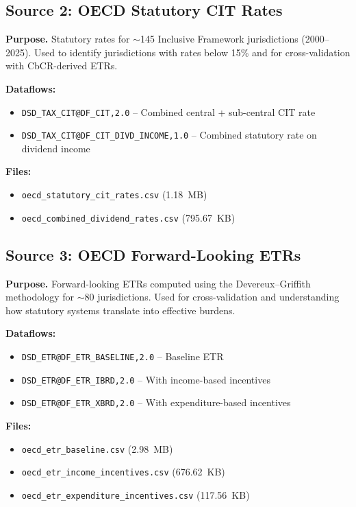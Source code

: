 \documentclass[12pt,a4paper]{article}
\begin{document}
\subsection{Source 2: OECD Statutory CIT Rates}\label{sec:src_citrates}

\textbf{Purpose.}
Statutory rates for $\sim$145 Inclusive Framework jurisdictions (2000--2025).
Used to identify jurisdictions with rates below 15\% and for cross-validation with CbCR-derived ETRs.

\textbf{Dataflows:}
\begin{itemize}[nosep]
    \item \texttt{DSD\_TAX\_CIT@DF\_CIT,2.0} -- Combined central + sub-central CIT rate
    \item \texttt{DSD\_TAX\_CIT@DF\_CIT\_DIVD\_INCOME,1.0} -- Combined statutory rate on dividend income
\end{itemize}

\textbf{Files:}
\begin{itemize}[nosep]
    \item \texttt{oecd\_statutory\_cit\_rates.csv} (1.18~MB)
    \item \texttt{oecd\_combined\_dividend\_rates.csv} (795.67~KB)
\end{itemize}


\subsection{Source 3: OECD Forward-Looking ETRs}\label{sec:src_etr}

\textbf{Purpose.}
Forward-looking ETRs computed using the Devereux--Griffith methodology for $\sim$80 jurisdictions.
Used for cross-validation and understanding how statutory systems translate into effective burdens.

\textbf{Dataflows:}
\begin{itemize}[nosep]
    \item \texttt{DSD\_ETR@DF\_ETR\_BASELINE,2.0} -- Baseline ETR
    \item \texttt{DSD\_ETR@DF\_ETR\_IBRD,2.0} -- With income-based incentives
    \item \texttt{DSD\_ETR@DF\_ETR\_XBRD,2.0} -- With expenditure-based incentives
\end{itemize}

\textbf{Files:}
\begin{itemize}[nosep]
    \item \texttt{oecd\_etr\_baseline.csv} (2.98~MB)
    \item \texttt{oecd\_etr\_income\_incentives.csv} (676.62~KB)
    \item \texttt{oecd\_etr\_expenditure\_incentives.csv} (117.56~KB)
\end{itemize}
\end{document}
